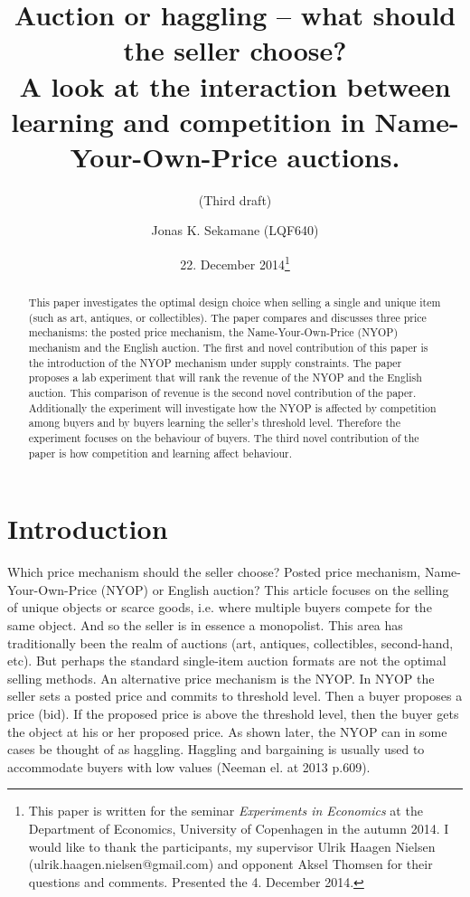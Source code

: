 \documentclass[a4paper,12pt]{article}
\title{\Large {\bf Auction or haggling -- what should the seller choose?} \\ A look at the interaction between learning and competition in Name-Your-Own-Price auctions.}
\subtitle{(Third draft)}
\author{Jonas K. Sekamane (LQF640)}
\date{22. December 2014\thanks{This paper is written for the seminar \emph{Experiments in Economics} at the Department of Economics, University of Copenhagen in the autumn 2014. I would like to thank the participants, my supervisor Ulrik Haagen Nielsen (ulrik.haagen.nielsen@gmail.com) and opponent Aksel Thomsen for their questions and comments. Presented the 4. December 2014.}}
\makeatletter
\renewcommand\tableofcontents{%
    \@starttoc{toc}%
}
\makeatother
\begin{document}
	
	\clearpage
	\thispagestyle{empty}
	
	\maketitle{}
		
	\newpage
	
	\begin{abstract}
		{This paper investigates the optimal design choice when selling a single and unique item (such as art, antiques, or collectibles). The paper compares and discusses three price mechanisms: the posted price mechanism, the Name-Your-Own-Price (NYOP) mechanism and the English auction. The first and novel contribution of this paper is the introduction of the NYOP mechanism under supply constraints. The paper proposes a lab experiment that will rank the revenue of the NYOP and the English auction. This comparison of revenue is the second novel contribution of the paper. Additionally the experiment will investigate how the NYOP is affected by competition among buyers and by buyers learning the seller's threshold level. Therefore the experiment focuses on the behaviour of buyers. The third novel contribution of the paper is how competition and learning affect behaviour.}
	\end{abstract}
	
	\tableofcontents
	
	\newpage
	
	\clearpage %
	\setcounter{page}{1}

	\section{Introduction}

	Which price mechanism should the seller choose? Posted price mechanism, Name-Your-Own-Price (NYOP) or English auction? This article focuses on the selling of unique objects or scarce goods, i.e. where multiple buyers compete for the same object. And so the seller is in essence a monopolist. This area has traditionally been the realm of auctions (art, antiques, collectibles, second-hand, etc). But perhaps the standard single-item auction formats are not the optimal selling methods. An alternative price mechanism is the NYOP. In NYOP the seller sets a posted price and commits to threshold level. Then a buyer proposes a price (bid). If the proposed price is above the threshold level, then the buyer gets the object at his or her proposed price. As shown later, the NYOP can in some cases be thought of as haggling. Haggling and bargaining is usually used to accommodate buyers with low values (Neeman el. at 2013 p.609). %
	
\end{document}
